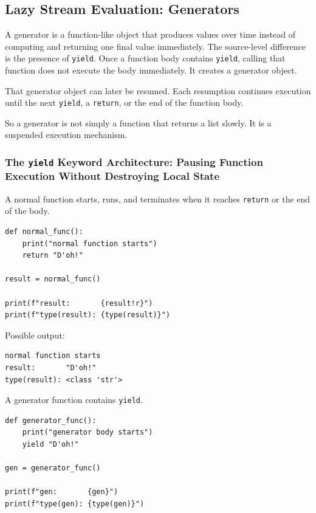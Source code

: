 \subsection{Lazy Stream Evaluation: Generators}

A generator is a function-like object that produces values over time instead of computing and returning one final value immediately. The source-level difference is the presence of \texttt{yield}. Once a function body contains \texttt{yield}, calling that function does not execute the body immediately. It creates a generator object.

That generator object can later be resumed. Each resumption continues execution until the next \texttt{yield}, a \texttt{return}, or the end of the function body.

So a generator is not simply a function that returns a list slowly. It is a suspended execution mechanism.

\subsubsection{The \texttt{yield} Keyword Architecture: Pausing Function Execution Without Destroying Local State}

A normal function starts, runs, and terminates when it reaches \texttt{return} or the end of the body.

\begin{verbatim}
def normal_func():
    print("normal function starts")
    return "D'oh!"

result = normal_func()

print(f"result:       {result!r}")
print(f"type(result): {type(result)}")
\end{verbatim}

Possible output:

\begin{verbatim}
normal function starts
result:       "D'oh!"
type(result): <class 'str'>
\end{verbatim}

A generator function contains \texttt{yield}.

\begin{verbatim}
def generator_func():
    print("generator body starts")
    yield "D'oh!"

gen = generator_func()

print(f"gen:       {gen}")
print(f"type(gen): {type(gen)}")
\end{verbatim}

